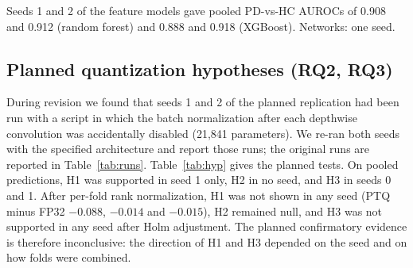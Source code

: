\documentclass[preprint,12pt]{elsarticle}
\begin{document}
\begin{table}[!t]
\caption{Participant-level benchmark (seed 0). Pooled AUROC with 95\% bootstrap CI; within-fold AUROC as mean (SD over five folds).}
\label{tab:main}
\centering
{}

\vspace{2pt}\parbox{\linewidth}{\footnotesize Seeds 1 and 2 of the feature models gave pooled PD-vs-HC AUROCs of 0.908 and 0.912 (random forest) and 0.888 and 0.918 (XGBoost). Networks: one seed.}
\end{table}

\subsection{Planned quantization hypotheses (RQ2, RQ3)}
\label{sec:planned}
During revision we found that seeds 1 and 2 of the planned replication had been run with a script in which the batch normalization after each depthwise convolution was accidentally disabled (21,841 parameters). We re-ran both seeds with the specified architecture and report those runs; the original runs are reported in Table~\ref{tab:runs}. Table~\ref{tab:hyp} gives the planned tests. On pooled predictions, H1 was supported in seed 1 only, H2 in no seed, and H3 in seeds 0 and 1. After per-fold rank normalization, H1 was not shown in any seed (PTQ minus FP32 $-0.088$, $-0.014$ and $-0.015$), H2 remained null, and H3 was not supported in any seed after Holm adjustment. The planned confirmatory evidence is therefore inconclusive: the direction of H1 and H3 depended on the seed and on how folds were combined.
\end{document}
